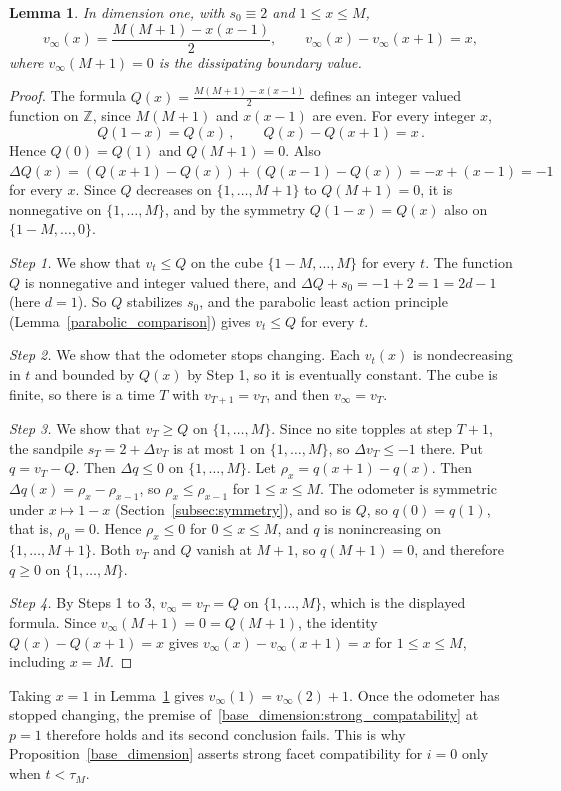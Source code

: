 \documentclass[12pt]{amsart}
\newtheorem{lemma}[theorem]{Lemma}
\begin{document}
	\begin{lemma}\label{lem:one-terminal-profile}
    In dimension one, with $s_0\equiv2$ and $1\leq x\leq M$,
    \[
    v_\infty(x)=\frac{M(M+1)-x(x-1)}2,\qquad
    v_\infty(x)-v_\infty(x+1)=x,
    \]
    where $v_\infty(M+1)=0$ is the dissipating boundary value.
    \end{lemma}
    \begin{proof}
    The formula $Q(x)=\frac{M(M+1)-x(x-1)}{2}$ defines an integer valued function on $\mathbb{Z}$, since $M(M+1)$ and $x(x-1)$ are even. For every integer $x$,
    \begin{equation*}
    Q(1-x)=Q(x)\,,\qquad Q(x)-Q(x+1)=x\,.
    \end{equation*}
    Hence $Q(0)=Q(1)$ and $Q(M+1)=0$. Also $\Delta Q(x)=(Q(x+1)-Q(x))+(Q(x-1)-Q(x))=-x+(x-1)=-1$ for every $x$. Since $Q$ decreases on $\{1,\dots,M+1\}$ to $Q(M+1)=0$, it is nonnegative on $\{1,\dots,M\}$, and by the symmetry $Q(1-x)=Q(x)$ also on $\{1-M,\dots,0\}$.

    \emph{Step 1.} We show that $v_t\leq Q$ on the cube $\{1-M,\dots,M\}$ for every $t$. The function $Q$ is nonnegative and integer valued there, and $\Delta Q+s_0=-1+2=1=2d-1$ (here $d=1$). So $Q$ stabilizes $s_0$, and the parabolic least action principle (Lemma~\ref{parabolic_comparison}) gives $v_t\leq Q$ for every $t$.

    \emph{Step 2.} We show that the odometer stops changing. Each $v_t(x)$ is nondecreasing in $t$ and bounded by $Q(x)$ by Step 1, so it is eventually constant. The cube is finite, so there is a time $T$ with $v_{T+1}=v_T$, and then $v_\infty=v_T$.

    \emph{Step 3.} We show that $v_T\geq Q$ on $\{1,\dots,M\}$. Since no site topples at step $T+1$, the sandpile $s_T=2+\Delta v_T$ is at most $1$ on $\{1,\dots,M\}$, so $\Delta v_T\leq -1$ there. Put $q=v_T-Q$. Then $\Delta q\leq 0$ on $\{1,\dots,M\}$. Let $\rho_x=q(x+1)-q(x)$. Then $\Delta q(x)=\rho_x-\rho_{x-1}$, so $\rho_x\leq\rho_{x-1}$ for $1\leq x\leq M$. The odometer is symmetric under $x\mapsto 1-x$ (Section~\ref{subsec:symmetry}), and so is $Q$, so $q(0)=q(1)$, that is, $\rho_0=0$. Hence $\rho_x\leq 0$ for $0\leq x\leq M$, and $q$ is nonincreasing on $\{1,\dots,M+1\}$. Both $v_T$ and $Q$ vanish at $M+1$, so $q(M+1)=0$, and therefore $q\geq 0$ on $\{1,\dots,M\}$.

    \emph{Step 4.} By Steps 1 to 3, $v_\infty=v_T=Q$ on $\{1,\dots,M\}$, which is the displayed formula. Since $v_\infty(M+1)=0=Q(M+1)$, the identity $Q(x)-Q(x+1)=x$ gives $v_\infty(x)-v_\infty(x+1)=x$ for $1\leq x\leq M$, including $x=M$.
    \end{proof}
	Taking $x=1$ in Lemma~\ref{lem:one-terminal-profile} gives $v_\infty(1)=v_\infty(2)+1$. Once the odometer has stopped changing, the premise of~\eqref{base_dimension:strong_compatability} at $p=1$ therefore holds and its second conclusion fails. This is why Proposition~\ref{base_dimension} asserts strong facet compatibility for $i=0$ only when $t<\tau_M$.
	
\end{document}

